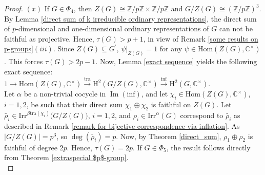 \documentclass[a4paper,11pt]{amsart}
\numberwithin{equation}{section}
\numberwithin{equation}{subsection}
\newcommand{\C}{\mathbb{C}}
\newcommand{\Z}{\mathbb{Z}}
\newcommand{\Hom}{\mathrm{Hom}}
\newcommand{\poonam}[1]{{\color{blue} #1}}
\begin{document}
\begin{proof}

$(x)$ \label{Phi4} If $G \in \Phi_{4}$, then $Z(G) \cong \Z/p\Z \times \Z/p\Z$ and $G/Z(G) \cong (\Z/p\Z)^3$. By Lemma \ref{direct sum of k irreducible ordinary representations}, the direct sum of $p$-dimensional and one-dimensional ordinary representations of $G$ can not be faithful as projective. Hence, $\tau(G) >p+1$, in view of Remark \ref{some results on p-groups}$(iii)$. Since $Z(G) \subseteq G^\prime$,  $\psi|_{Z(G)}= 1$ for any $\psi \in \Hom(Z(G), \C^\times)$. This forces $\tau(G) >2p-1$. 
Now, Lemma \ref{exact sequence} yields the following exact sequence: \\

$1 \to \mathrm{Hom}(Z(G), \mathbb{C}^{\times}) 
\xrightarrow{\mathrm{tra}} 
\mathrm{H}^2(G/Z(G), \mathbb{C}^{\times}) 
\xrightarrow{\mathrm{inf}} \mathrm{H}^2(G, \mathbb{C}^{\times})$. \\

Let $\alpha$ be a non-trivial cocycle in $\operatorname{Im} \operatorname{(inf)}$, and let $\chi_i \in\mathrm{Hom}(Z(G), \mathbb{C}^{\times})$, $i=1,2$, be such that their direct sum $\chi_1 \oplus \chi_2$ is faithful on $Z(G)$. Let $\tilde{\rho_i} \in \mathrm{Irr}^{\beta \mathrm{tra}(\chi_i)}\big(G/Z(G)\big)$, $i=1,2$, and $\rho_i \in \mathrm{Irr}^{\alpha}(G)$ correspond to $\tilde{\rho_i}$ as described in Remark \ref{remark for bijective correspondence via inflation}. As $|G/Z(G)|= p^3$, so $\operatorname{deg}(\tilde{\rho_i})= p$. Now, by Theorem \ref{direct_sum}, $\rho_1 \oplus \rho_2$ is faithful of degree $2p$. Hence, $\tau(G)= 2p$.
If $G \in \Phi_{5}$, the result follows directly from Theorem \ref{extraspecial $p$-group}. \\


\end{proof}
\end{document}
